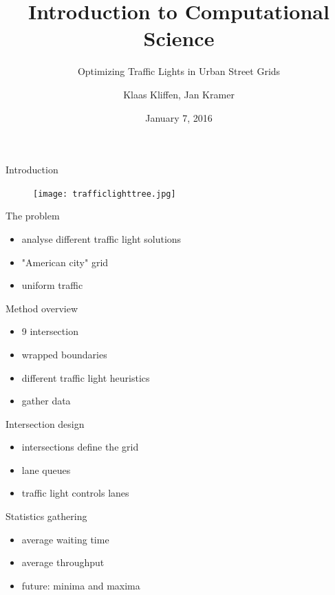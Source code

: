\documentclass[11pt]{beamer}
\title{Introduction to Computational Science}
\subtitle{Optimizing Traffic Lights in Urban Street Grids}
\author{Klaas Kliffen, Jan Kramer}
\date{January 7, 2016}
\begin{document}
\maketitle

\begin{frame}{Introduction}
\begin{figure}
\centering
\texttt{[image: trafficlighttree.jpg]}
\end{figure}
\end{frame}

\begin{frame}{The problem}
\begin{itemize}
    \item analyse different traffic light solutions
    \item "American city" grid
    \item uniform traffic
\end{itemize}
\end{frame}

\begin{frame}{Method overview}
\begin{itemize}
    \item 9 intersection
    \item wrapped boundaries
    \item different traffic light heuristics
    \item gather data
\end{itemize}
\end{frame}

\begin{frame}{Intersection design}
\begin{itemize}
\item intersections define the grid
\item lane queues
\item traffic light controls lanes
\end{itemize}
\end{frame}

\begin{frame}{Statistics gathering}
\begin{itemize}
\item average waiting time
\item average throughput
\item future: minima and maxima
\end{itemize}
\end{frame}
\end{document}
